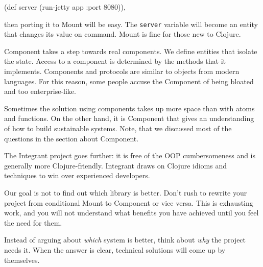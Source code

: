 \else

\begin{english}
  \begin{clojure}
(def server (run-jetty app {:port 8080})),
  \end{clojure}
\end{english}

\fi

\noindent
then porting it to Mount will be easy.
The \verb|server| variable will become an entity that changes its value on command. Mount is fine for those new to Clojure.

Component takes a step towards real components. We define entities that isolate the state. Access to a component is determined by the methods that it implements. Components and protocols are similar to objects from modern languages. For this reason, some people accuse the Component of being bloated and too enterprise-like.

Sometimes the solution using components takes up more space than with atoms and functions. On the other hand, it is Component that gives an understanding of how to build sustainable systems. Note, that we discussed most of the questions in the section about Component.

The Integrant project goes further: it is free of the OOP cumbersomeness and is generally more Clojure-friendly. Integrant draws on Clojure idioms and techniques to win over experienced developers.

Our goal is not to find out which library is better. Don't rush to rewrite your project from conditional Mount to Component or vice versa. This is exhausting work, and you will not understand what benefits you have achieved until you feel the need for them.

Instead of arguing about \emph{which} system is better, think about \emph{why} the project needs it. When the answer is clear, technical solutions will come up by themselves.
